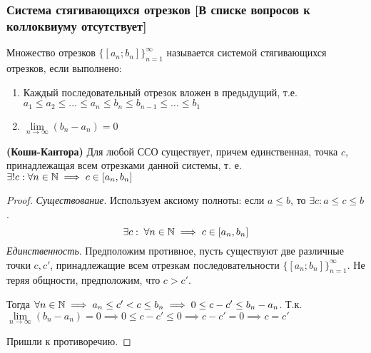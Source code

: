 \documentclass[12pt, a4paper]{article}
\begin{document}
	\subsubsection{Система стягивающихся отрезков [В списке вопросов к коллоквиуму отсутствует]} \label{sss:segments}
	Множество отрезков $\{[a_n; b_n]\}_{n=1}^{\infty}$ называется системой стягивающихся отрезков, если выполнено:
	\begin{enumerate}
		\item
		Каждый последовательный отрезок вложен в предыдущий, т.е. $a_1 \leq a_2 \leq ... \leq a_n \leq b_n \leq b_{n - 1} \leq \dots \leq b_1$

		\item
		$\lim\limits_{n \to \infty} (b_n - a_n) = 0$
	\end{enumerate}
	\begin{lemma}
		\textbf{(Коши-Кантора)} Для любой ССО существует, причем единственная, точка $c$, принадлежащая всем отрезками данной системы, т. е. $\exists! c: \forall n \in \mathbb{N} \implies c \in [a_n, b_n]$
	\end{lemma}
	\begin{proof}
		\emph{Существование}. Используем аксиому полноты: если $a \leq b$, то $\exists c: a \leq c \leq b$.
		\begin{equation*}
			\exists c: \; \forall n \in \mathbb{N} \implies c \in [a_n, b_n]
		\end{equation*}
		\emph{Единственность}. Предположим противное, пусть существуют две различные точки $c, c'$, принадлежащие всем отрезкам последовательности $\{[a_n; b_n]\}_{n=1}^{\infty}$. Не теряя общности, предположим, что $c > c'$.
		
		Тогда $\forall n \in \mathbb{N} \implies a_n \leq c' < c \leq b_n \implies 0 \leq c - c' \leq b_n - a_n$. Т.к. $\lim\limits_{n \to \infty} (b_n - a_n) = 0 \implies 0 \leq c - c' \leq 0 \implies c - c' = 0 \implies c = c'$

		Пришли к противоречию.
	\end{proof}
\end{document}
